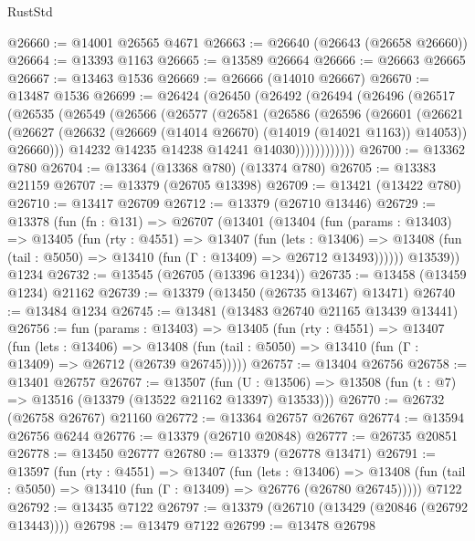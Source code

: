 \begin{lexlean}{RustStd}
\begin{coremodule}
@26660 := @14001 @26565 @4671
@26663 := @26640 (@26643 (@26658 @26660))
@26664 := @13393 @1163
@26665 := @13589 @26664
@26666 := @26663 @26665
@26667 := @13463 @1536
@26669 := @26666 (@14010 @26667)
@26670 := @13487 @1536
@26699 := @26424
    (@26450
      (@26492
        (@26494
          (@26496
            (@26517
              (@26535
                (@26549
                  (@26566
                    (@26577
                      (@26581
                        (@26586
                          (@26596
                            (@26601
                              (@26621
                                (@26627
                                  (@26632 (@26669 (@14014 @26670) (@14019 (@14021 @1163)) @14053))
                                  @26660)))
                            @14232
                            @14235
                            @14238
                            @14241
                            @14030))))))))))))
@26700 := @13362 @780
@26704 := @13364 (@13368 @780) (@13374 @780)
@26705 := @13383 @21159
@26707 := @13379 (@26705 @13398)
@26709 := @13421 (@13422 @780)
@26710 := @13417 @26709
@26712 := @13379 (@26710 @13446)
@26729 := @13378
    (fun (fn : @131) =>
    @26707
      (@13401
        (@13404
          (fun (params : @13403) =>
          @13405
            (fun (rty : @4551) =>
            @13407
              (fun (lets : @13406) =>
              @13408 (fun (tail : @5050) => @13410 (fun (Γ : @13409) => @26712 @13493))))))
        @13539))
    @1234
@26732 := @13545 (@26705 (@13396 @1234))
@26735 := @13458 (@13459 @1234) @21162
@26739 := @13379 (@13450 (@26735 @13467) @13471)
@26740 := @13484 @1234
@26745 := @13481 (@13483 @26740 @21165 @13439 @13441)
@26756 := fun (params : @13403) =>
  @13405
    (fun (rty : @4551) =>
    @13407
      (fun (lets : @13406) =>
      @13408 (fun (tail : @5050) => @13410 (fun (Γ : @13409) => @26712 (@26739 @26745)))))
@26757 := @13404 @26756
@26758 := @13401 @26757
@26767 := @13507
    (fun (U : @13506) => @13508 (fun (t : @7) => @13516 (@13379 (@13522 @21162 @13397) @13533)))
@26770 := @26732 (@26758 @26767) @21160
@26772 := @13364 @26757 @26767
@26774 := @13594 @26756 @6244
@26776 := @13379 (@26710 @20848)
@26777 := @26735 @20851
@26778 := @13450 @26777
@26780 := @13379 (@26778 @13471)
@26791 := @13597
    (fun (rty : @4551) =>
    @13407
      (fun (lets : @13406) =>
      @13408 (fun (tail : @5050) => @13410 (fun (Γ : @13409) => @26776 (@26780 @26745)))))
    @7122
@26792 := @13435 @7122
@26797 := @13379 (@26710 (@13429 (@20846 (@26792 @13443))))
@26798 := @13479 @7122
@26799 := @13478 @26798

\end{coremodule}
\end{lexlean}
